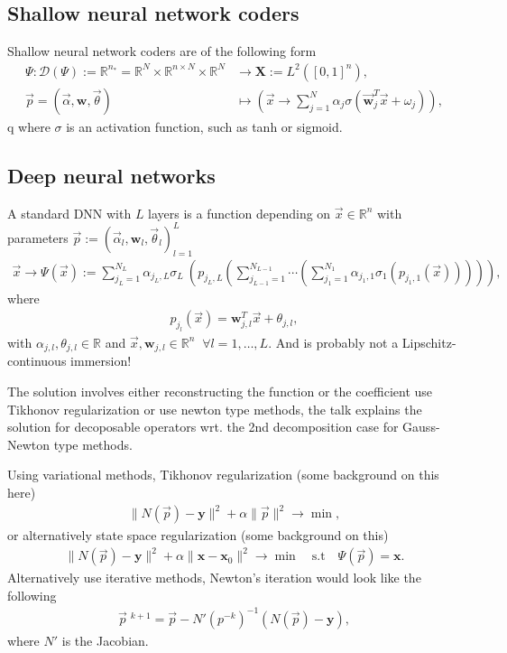 \subsection{Shallow neural network coders}
Shallow neural network coders are of the following form
\begin{align}
    \Psi:
    \mathcal{D}(\Psi) := \mathbb{R}^{n_*} =
    \mathbb{R}^{N}\times \mathbb{R}^{n \times N}
    \times \mathbb{R}^{N}
    &\to \mathbf{X} :=
    L^{2}\left([0, 1]^{n}\right),\\
    \vec{p} = (\vec{\alpha}, \mathbf{w}, \vec{\theta}) &\mapsto
    \left(\vec{x} \to \sum_{j=1}^{N} \alpha_j\sigma\left(
    \vec{\mathbf{w}}_j^{T}\vec{x} + \omega_j \right)  \right),
\end{align}q
where $\sigma$ is an activation function, such as tanh or sigmoid.

\subsection{Deep neural networks}
A standard DNN with $L$ layers is a function depending on $\vec{x} \in
\mathbb{R}^{n}$ with parameters $\vec{p}:=\left( \vec{\alpha}_l,
\mathbf{w}_l, \vec{\theta}_l  \right)_{l=1}^{L}$
\begin{align}
    \vec{x}\to\Psi(\vec{x}) := \sum_{j_L=1}^{N_L} \alpha_{j_L,L}\sigma_L\
    \left( p_{j_L, L} \left( \sum_{j_{L-1}=1}^{N_{L-1}}\cdots
    \left( \sum_{j_1=1}^{N_1}\alpha_{j_1,1}\sigma_1\left(p_{j_1,1}(\vec{x})
    \right)  \right)  \right)  \right),
\end{align}
where
\begin{align}
    p_{j_l}(\vec{x}) = \mathbf{w}_{j, l}^{T}\vec{x} + \theta_{j,l},
\end{align}
with $\alpha_{j,l}, \theta_{j,l} \in \mathbb{R}$ and $\vec{x},
\mathbf{w}_{j,l} \in \mathbb{R}^{n} \;\; \forall l=1,\ldots,L$. And is
probably not a Lipschitz-continuous immersion!


The solution involves either reconstructing the function or the coefficient use
Tikhonov regularization or use newton type methods, the talk explains the
solution for decoposable operators wrt. the 2nd decomposition case for
Gauss-Newton type methods.

Using variational methods, Tikhonov regularization (some background on this
here)
\begin{align}
    \|N(\vec{p}) - \mathbf{y}\|^{2} + \alpha \|\vec{p}\|^{2} \to \min,
\end{align}
or alternatively state space regularization (some background on this)
\begin{align}
    \|N(\vec{p}) - \mathbf{y}\|^{2}
    + \alpha \|\mathbf{x} - \mathbf{x}_0\|^{2}
    \to \min \quad \text{s.t} \quad \Psi(\vec{p}) = \mathbf{x}.
\end{align}
Alternatively use iterative methods, Newton's iteration would look like the
following
\begin{align}
    \vec{p}\;^{k+1} = \vec{p} - N'\left(p^{-k}\right)^{-1}\left(N(\vec{p}) -
    \mathbf{y}  \right),
\end{align}
where $N'$ is the Jacobian.

